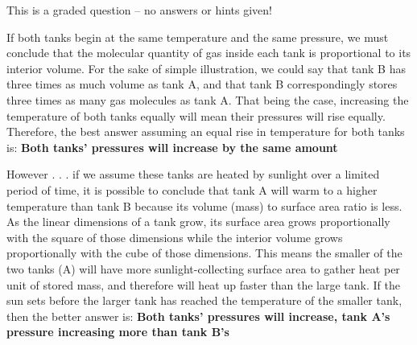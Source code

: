 \vfil

\eject






This is a graded question -- no answers or hints given!







If both tanks begin at the same temperature and the same pressure, we must conclude that the molecular quantity of gas inside each tank is proportional to its interior volume.  For the sake of simple illustration, we could say that tank B has three times as much volume as tank A, and that tank B correspondingly stores three times as many gas molecules as tank A.  That being the case, increasing the temperature of both tanks equally will mean their pressures will rise equally.  Therefore, the best answer assuming an equal rise in temperature for both tanks is: {\bf Both tanks' pressures will increase by the same amount}

\vskip 10pt

However . . . if we assume these tanks are heated by sunlight over a limited period of time, it is possible to conclude that tank A will warm to a higher temperature than tank B because its volume (mass) to surface area ratio is less.  As the linear dimensions of a tank grow, its surface area grows proportionally with the square of those dimensions while the interior volume grows proportionally with the cube of those dimensions.  This means the smaller of the two tanks (A) will have more sunlight-collecting surface area to gather heat per unit of stored mass, and therefore will heat up faster than the large tank.  If the sun sets before the larger tank has reached the temperature of the smaller tank, then the better answer is: {\bf Both tanks' pressures will increase, tank A's pressure increasing more than tank B's}




